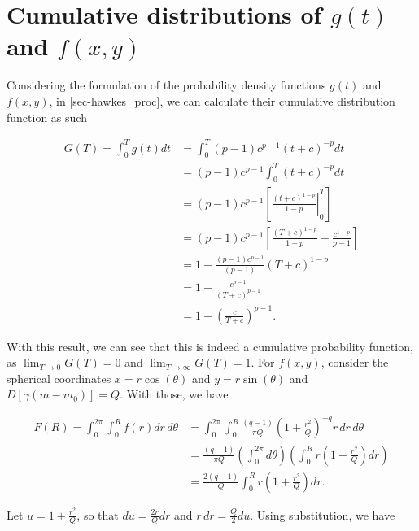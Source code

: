 \chapter{Cumulative distributions of $g(t)$ and $f(x,y)$}
\label{append-acum}

Considering the formulation of the probability density functions $g(t)$ and $f(x,y)$, in \autoref{sec-hawkes_proc}, we can calculate their cumulative distribution function as such

\begin{align*}
  G(T) = \int_{0}^{T}g(t)dt &= \int_{0}^{T}(p-1)c^{p-1}(t + c)^{-p}dt \\
                            &= (p - 1)c^{p - 1}\int_{0}^{T}(t + c)^{-p}dt \\
                            &= (p - 1)c^{p - 1}\left[\left.\frac{(t + c)^{1 - p}}{1 - p}\right|_{0}^{T}\right] \\
                            &= (p - 1)c^{p - 1}\left[\frac{(T + c)^{1 - p}}{1 - p} + \frac{c^{1 - p}}{p - 1}\right] \\
                            &= 1 - \frac{(p - 1)c^{p - 1}}{(p - 1)}(T + c)^{1 - p} \\
                            &= 1 - \frac{c^{p - 1}}{(T + c)^{p - 1}} \\
                            &= 1 - \left(\frac{c}{T + c}\right)^{p - 1}.
\end{align*}

With this result, we can see that this is indeed a cumulative probability function, as $\lim_{T \to 0}G(T) = 0$ and $\lim_{T \to \infty}G(T) = 1$. For $f(x,y)$, consider the spherical coordinates $x = r\cos(\theta)$ and $y = r\sin(\theta)$ and $D[\gamma(m - m_{0})] = Q$. With those, we have

\begin{align*}
  F(R) = \int_{0}^{2\pi}\int_{0}^{R}f(r)dr\, d\theta &= \int_{0}^{2\pi}\int_{0}^{R}\frac{(q-1)}{\pi Q}\left(1 + \frac{r^{2}}{Q}\right)^{-q}r\, dr\, d\theta \\
                                                     &= \frac{(q - 1)}{\pi Q}\left(\int_{0}^{2\pi}d\theta\right)\left(\int_{0}^{R}r\left(1 + \frac{r^{2}}{Q}\right)dr\right) \\
                                                     &= \frac{2(q - 1)}{Q}\int_{0}^{R}r\left(1 + \frac{r^{2}}{Q}\right)dr.
\end{align*}

Let $u = 1 + \frac{r^{2}}{Q}$, so that $du = \frac{2r}{Q}dr$ and $r\, dr = \frac{Q}{2}du$. Using substitution, we have

